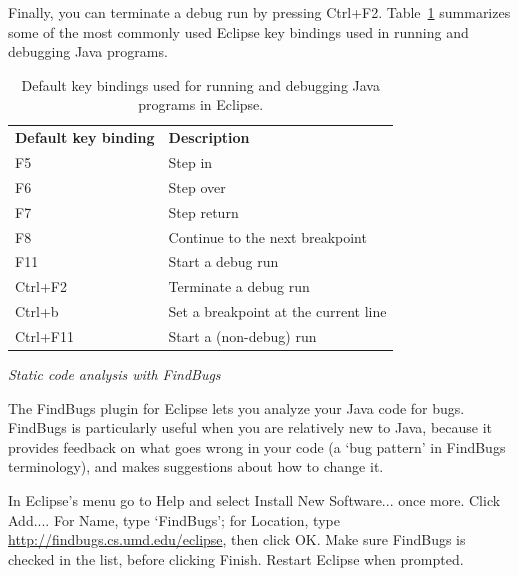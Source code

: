 \documentclass[12pt, a4paper, twoside,openany,titlepage]{article}
\begin{document}
{Finally, you can terminate a debug run by pressing \textsf{Ctrl+F2}. Table~\ref{tab:key-bindings-eclipse} summarizes some of the most commonly used Eclipse key bindings used in running and debugging Java programs.


\begin{table}[!ht]
\vspace{1.0em}
\caption{Default key bindings used for running and debugging Java programs in Eclipse.\label{tab:key-bindings-eclipse}}
\begin{tabular}{lp{10cm}}
\vspace{0.5em}
\textbf{Default key binding} & \textbf{Description}                  \\
\textsf{F5}                  & Step in                               \\
\textsf{F6}                  & Step over                             \\
\textsf{F7}                  & Step return                           \\
\textsf{F8}                  & Continue to the next breakpoint       \\
\textsf{F11}                 & Start a debug run                     \\
\textsf{Ctrl+F2}             & Terminate a debug run                 \\
\textsf{Ctrl+b}              & Set a breakpoint at the current line  \\
\textsf{Ctrl+F11}            & Start a (non-debug) run               \\
\end{tabular}
\end{table}





\vspace{2em}
\textit{Static code analysis with FindBugs}

The FindBugs plugin for Eclipse lets you analyze your Java code for bugs. FindBugs is particularly useful when you are relatively new to Java, because it provides feedback on what goes wrong in your code (a `bug pattern' in FindBugs terminology), and makes suggestions about how to change it.

In Eclipse's menu go to \textsf{Help} and select \textsf{Install New Software...} once more. Click \textsf{Add...}. For \textsf{Name}, type `FindBugs'; for \textsf{Location}, type \url{ http://findbugs.cs.umd.edu/eclipse}, then click \textsf{OK}. Make sure \textsf{FindBugs} is checked in the list, before clicking \textsf{Finish}. Restart Eclipse when prompted.

}
\end{document}
